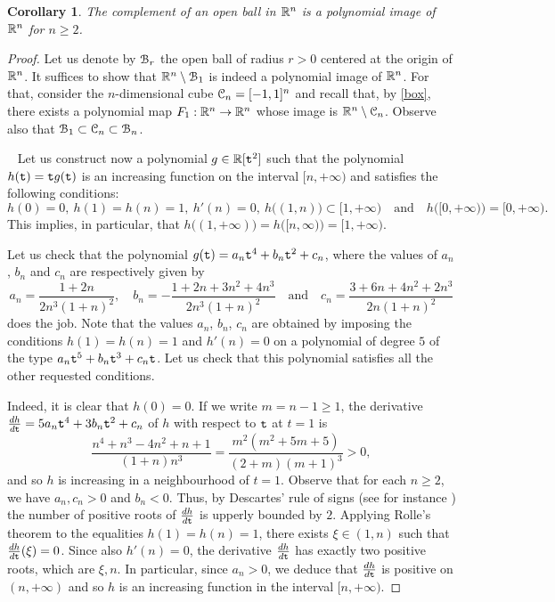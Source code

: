 \documentclass[11pt,a4paper]{amsart}
\newtheorem{cor}[theor]{Corollary}
\theoremstyle{definition}
\theoremstyle{remark}
\newcounter{substep}
\def\thesubstep{\arabic{substep}}
\newenvironment{substeps}[1]{%
\refstepcounter{substep}\noindent{ (\ref{#1}.\thesubstep)\ }\ }%
{\em}
\newcommand{\ball}{{\EuScript B}}
\newcommand{\cube}{{\EuScript C}}
\begin{document}
\begin{cor}\label{openball} 
The complement of an open ball in ${\mathbb R}^n$ is a polynomial image of ${\mathbb R}^n$ for $n\geq2$.
\end{cor}
\begin{proof}
Let us denote by ${\ball}_r$ the open ball of radius $r>0$ centered at the origin of ${\mathbb R}^n$. It suffices to show that $\R^n\setminus{\ball}_1$ is indeed a polynomial image of ${\mathbb R}^n$. For that, consider the $n$-dimensional cube $\cube_n=[-1,1]^n$ and recall that, by \ref{box}, there exists a polynomial map $F_1:{\mathbb R}^n\to{\mathbb R}^n$ whose image is $\R^n\setminus\cube_n$. Observe also that $\ball_1\subset\cube_n\subset\ball_n$.

\vspace{2mm}\setcounter{substep}{0}
\begin{substeps}{openball}
Let us construct now a polynomial $g\in{\mathbb R}[{{\tt t}}^2]$ such that the polynomial $h({\tt t})={\tt t} g({\tt t})$ is an increasing function on the interval $[n,+\infty)$ and satisfies the following conditions: 
$$
h(0)=0,\ h(1)=h(n)=1,\ h'(n)=0,\ h\big((1,n)\big)\subset[1,+\infty)\quad\text{and}\quad h\big([0,+\infty)\big)=[0,+\infty).
$$ 
This implies, in particular, that $h\big((1,+\infty)\big)=h\big([n,\infty)\big)=[1,+\infty)$.

Let us check that the polynomial $g({\tt t})=a_n{\tt t}^4+b_n{\tt t}^2+c_n$, where the values of $a_n$, $b_n$ and $c_n$ are
respectively given by
$$
a_n=\dfrac{1+2n}{2n^3(1+n)^2},\quad
b_n=-\dfrac{1+2n+3n^2+4n^3}{2n^3(1+n)^2}\quad\text{and}\quad
c_n=\dfrac{3+6n+4n^2+2n^3}{2n(1+n)^2}
$$
does the job. Note that the values $a_n$, $b_n$, $c_n$ are obtained by imposing the conditions $h(1)=h(n)=1$ and $h'(n)=0$ on a polynomial of degree $5$ of the type $a_n{\tt t}^5+b_n{\tt t}^3+c_n{\tt t}$. Let us check that this polynomial satisfies all the other requested conditions. 
\end{substeps}

\vspace{2mm}
Indeed, it is clear that $h(0)=0$. If we write $m=n-1\geq1$, the derivative $\frac{dh}{d{\tt t}}=5a_n{\tt t}^4+3b_n{\tt t}^2+c_n$ of $h$ with respect to ${\tt t}$ at $t=1$ is
$$
\frac{n^4+n^3-4n^2+n+1}{(1+n)n^3}=\frac{m^2(m^2+5m+5)}{(2+m)(m+1)^3}>0,
$$
and so $h$ is increasing in a neighbourhood of $t=1$. Observe that for each $n\geq2$, we have $a_n,c_n>0$ and $b_n<0$. Thus, by Descartes' rule of signs (see for instance \cite[4-10, pag.158]{m}) the number of positive roots of $\frac{dh}{d{\tt t}}$ is upperly bounded by $2$. Applying Rolle's theorem to the equalities $h(1)=h(n)=1$, there exists $\xi\in(1,n)$ such that $\frac{dh}{d{\tt t}}(\xi)=0$. Since also $h'(n)=0$, the derivative $\frac{dh}{d{\tt t}}$ has exactly two positive roots, which are $\xi,n$. In particular, since $a_n>0$, we deduce that $\frac{dh}{d{\tt t}}$ is positive on $(n,+\infty)$ and so $h$ is an increasing function in the interval $[n,+\infty)$. 


\end{proof}
\end{document}
